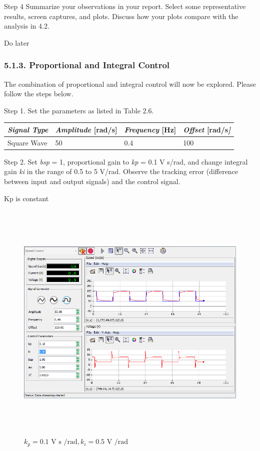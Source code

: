 \documentclass[]{article}
\begin{document}
Step 4 Summarize your observations in your report. Select some
representative results, screen captures, and plots. Discuss how your
plots compare with the analysis in 4.2.

Do later

\subsubsection{5.1.3. Proportional and Integral
Control}\label{proportional-and-integral-control}

The combination of proportional and integral control will now be
explored. Please follow the steps below.

Step 1. Set the parameters as listed in Table 2.6.

\begin{longtable}[]{@{}llll@{}}
\toprule
\emph{\textbf{Signal Type}} & \textbf{\emph{Amplitude} {[}rad/s{]}} &
\textbf{\emph{Frequency} {[}Hz{]}} & \textbf{\emph{Offset}
{[}rad/s\emph{{]}}}\tabularnewline
\midrule
\endhead
Square Wave & 50 & 0.4 & 100\tabularnewline
\bottomrule
\end{longtable}

Step 2. Set \emph{bsp} = 1, proportional gain to \emph{kp} = 0.1 V
s/rad, and change integral gain \emph{ki} in the range of 0.5 to 5
V/rad. Observe the tracking error (difference between input and output
signals) and the control signal.

Kp is constant

\begin{figure}\includegraphics[width=6.50000in,height=4.65278in]{media/image57.png} \caption{$k_p = \text{0.1 V s /rad}, k_i = \text{0.5 V /rad}$} \end{figure}
\end{document}
